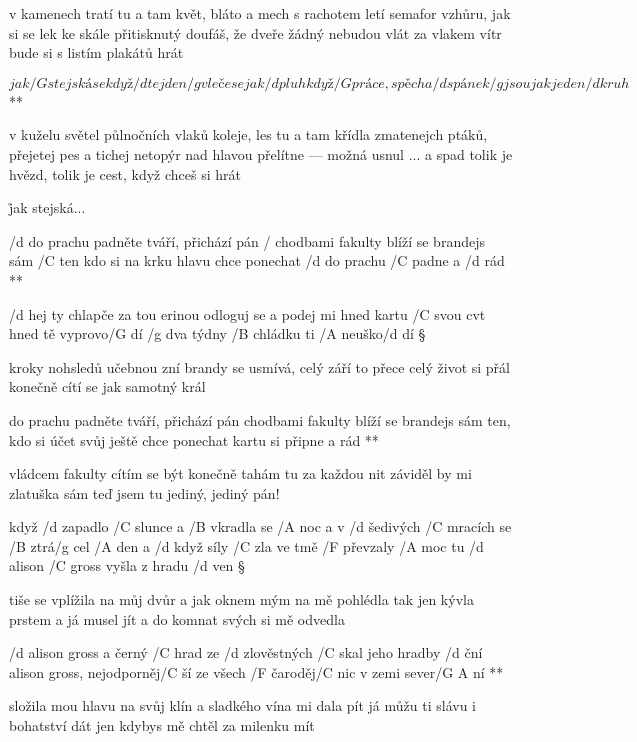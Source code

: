 v kamenech tratí tu a tam květ, bláto a mech
s rachotem letí semafor vzhůru, jak si se lek
ke skále přitisknutý doufáš, že dveře žádný nebudou vlát
za vlakem vítr bude si s listím plakátů hrát

\R  \[ jak /G stejská se když /d tejden /g vleče se jak /d pluh
    když /G práce, spěch a /d spánek /g jsou jak jeden /d kruh \] **

v kuželu světel půlnočních vlaků koleje, les
tu a tam křídla zmatenejch ptáků, přejetej pes
a tichej netopýr nad hlavou přelítne --- možná usnul ... a spad
tolik je hvězd, tolik je cest, když chceš si hrát

\r jak stejská...




\R  /d do prachu padněte tváří, přichází pán
    / chodbami fakulty blíží se brandejs sám
    /C ten kdo si na krku hlavu chce ponechat
    /d do prachu /C padne a /d rád **

/d hej ty chlapče za tou erinou
odloguj se a podej mi hned kartu /C svou
cvt hned tě vyprovo/G dí
/g dva týdny /B chládku ti /A neuško/d dí \S

kroky nohsledů učebnou zní
brandy se usmívá, celý září
to přece celý život si přál
konečně cítí se jak samotný král

\R  do prachu padněte tváří, přichází pán
    chodbami fakulty blíží se brandejs sám
    ten, kdo si účet svůj ještě chce ponechat
    kartu si připne a rád **

vládcem fakulty cítím se být
konečně tahám tu za každou nit
záviděl by mi zlatuška sám
teď jsem tu jediný, jediný pán!




když /d zapadlo /C slunce a /B vkradla se /A noc
a v /d šedivých /C mracích se /B ztrá/g cel /A den
a /d když síly /C zla ve tmě /F převzaly /A moc
tu /d alison /C gross vyšla z hradu /d ven \S

tiše se vplížila na můj dvůr
a jak oknem mým na mě pohlédla
tak jen kývla prstem a já musel jít
a do komnat svých si mě odvedla

\R  /d alison gross a černý /C hrad
    ze /d zlověstných /C skal jeho hradby /d ční
    alison gross, nejodporněj/C ší
    ze všech /F čaroděj/C nic v zemi sever/{G A} ní **

složila mou hlavu na svůj klín
a sladkého vína mi dala pít 
já můžu ti slávu i bohatství dát
jen kdybys mě chtěl za milenku mít \s

